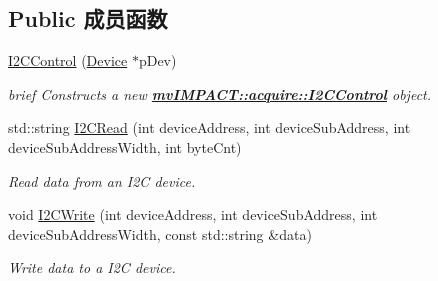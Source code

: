 \subsection*{Public 成员函数}
\begin{DoxyCompactItemize}
\item 
\hyperlink{classmv_i_m_p_a_c_t_1_1acquire_1_1_i2_c_control_a0caccb546bad1ad3fa85e5ab7f908099}{I2\+C\+Control} (\hyperlink{classmv_i_m_p_a_c_t_1_1acquire_1_1_device}{Device} $\ast$p\+Dev)
\begin{DoxyCompactList}\small\item\em brief Constructs a new {\bfseries \hyperlink{classmv_i_m_p_a_c_t_1_1acquire_1_1_i2_c_control}{mv\+I\+M\+P\+A\+C\+T\+::acquire\+::\+I2\+C\+Control}} object. \end{DoxyCompactList}\item 
std\+::string \hyperlink{classmv_i_m_p_a_c_t_1_1acquire_1_1_i2_c_control_ad1024608c37ae9b43cc2bf6b7e73b105}{I2\+C\+Read} (int device\+Address, int device\+Sub\+Address, int device\+Sub\+Address\+Width, int byte\+Cnt)
\begin{DoxyCompactList}\small\item\em Read data from an I2\+C device. \end{DoxyCompactList}\item 
void \hyperlink{classmv_i_m_p_a_c_t_1_1acquire_1_1_i2_c_control_ae251dc9025461c7096e0cf54919c8ed8}{I2\+C\+Write} (int device\+Address, int device\+Sub\+Address, int device\+Sub\+Address\+Width, const std\+::string \&data)
\begin{DoxyCompactList}\small\item\em Write data to a I2\+C device. \end{DoxyCompactList}\end{DoxyCompactItemize}
